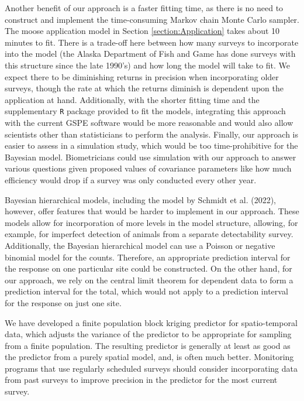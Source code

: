\documentclass[smallextended]{svjour3}       %
\begin{document}
Another benefit of our approach is a faster fitting time, as there is no
need to construct and implement the time-consuming Markov chain Monte
Carlo sampler. The moose application model in Section
\ref{section:Application} takes about 10 minutes to fit. There is a
trade-off here between how many surveys to incorporate into the model
(the Alaska Department of Fish and Game has done surveys with this
structure since the late 1990's) and how long the model will take to
fit. We expect there to be diminishing returns in precision when
incorporating older surveys, though the rate at which the returns
diminish is dependent upon the application at hand. Additionally, with
the shorter fitting time and the supplementary \texttt{R} package
provided to fit the models, integrating this approach with the current
GSPE software would be more reasonable and would also allow scientists
other than statisticians to perform the analysis. Finally, our approach
is easier to assess in a simulation study, which would be too
time-prohibitive for the Bayesian model. Biometricians could use
simulation with our approach to answer various questions given proposed
values of covariance parameters like how much efficiency would drop if a
survey was only conducted every other year.

Bayesian hierarchical models, including the model by Schmidt et al.
(2022), however, offer features that would be harder to implement in our
approach. These models allow for incorporation of more levels in the
model structure, allowing, for example, for imperfect detection of
animals from a separate detectability survey. Additionally, the Bayesian
hierarchical model can use a Poisson or negative binomial model for the
counts. Therefore, an appropriate prediction interval for the response
on one particular site could be constructed. On the other hand, for our
approach, we rely on the central limit theorem for dependent data to
form a prediction interval for the total, which would not apply to a
prediction interval for the response on just one site.

We have developed a finite population block kriging predictor for
spatio-temporal data, which adjusts the variance of the predictor to be
appropriate for sampling from a finite population. The resulting
predictor is generally at least as good as the predictor from a purely
spatial model, and, is often much better. Monitoring programs that use
regularly scheduled surveys should consider incorporating data from past
surveys to improve precision in the predictor for the most current
survey.
\end{document}
